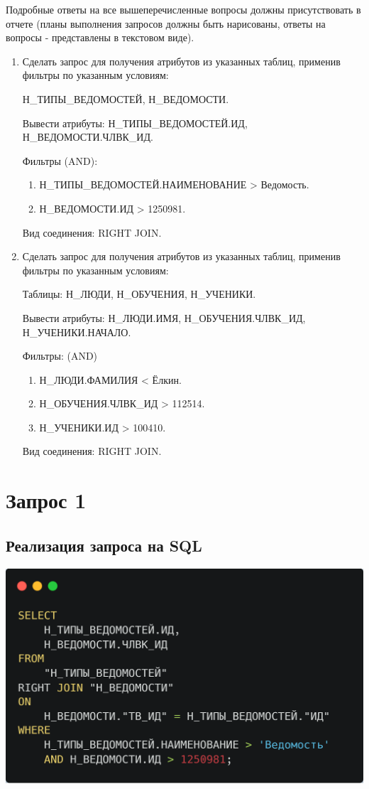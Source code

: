 \documentclass[12pt]{article}
\begin{document}
	Подробные ответы на все вышеперечисленные вопросы должны присутствовать в отчете (планы выполнения запросов должны быть нарисованы, ответы на вопросы - представлены в текстовом виде).
	
	\begin{enumerate}
		\item 	Сделать запрос для получения атрибутов из указанных таблиц, применив фильтры по указанным условиям:
			
			Н_ТИПЫ_ВЕДОМОСТЕЙ, Н_ВЕДОМОСТИ.
			
			Вывести атрибуты: Н_ТИПЫ_ВЕДОМОСТЕЙ.ИД, Н_ВЕДОМОСТИ.ЧЛВК_ИД.
			
			Фильтры (AND):
			\begin{enumerate}[]
			\item Н_ТИПЫ_ВЕДОМОСТЕЙ.НАИМЕНОВАНИЕ > Ведомость.
			\item Н_ВЕДОМОСТИ.ИД > 1250981.
			\end{enumerate}
			Вид соединения: RIGHT JOIN.
	
		\item Сделать запрос для получения атрибутов из указанных таблиц, применив фильтры по указанным условиям:
		
			Таблицы: Н_ЛЮДИ, Н_ОБУЧЕНИЯ, Н_УЧЕНИКИ.
			
			Вывести атрибуты: Н_ЛЮДИ.ИМЯ, Н_ОБУЧЕНИЯ.ЧЛВК_ИД, Н_УЧЕНИКИ.НАЧАЛО.
			
			Фильтры: (AND)
			\begin{enumerate}[]
			\item Н_ЛЮДИ.ФАМИЛИЯ < Ёлкин.
			\item Н_ОБУЧЕНИЯ.ЧЛВК_ИД > 112514.
			\item Н_УЧЕНИКИ.ИД > 100410.
			\end{enumerate}
			Вид соединения: RIGHT JOIN.
	\end{enumerate}
	\newpage
	
	\section{Запрос 1}
	\subsection{Реализация запроса на SQL}
	\includegraphics[width=0.5\linewidth]{sql1}
\end{document}
